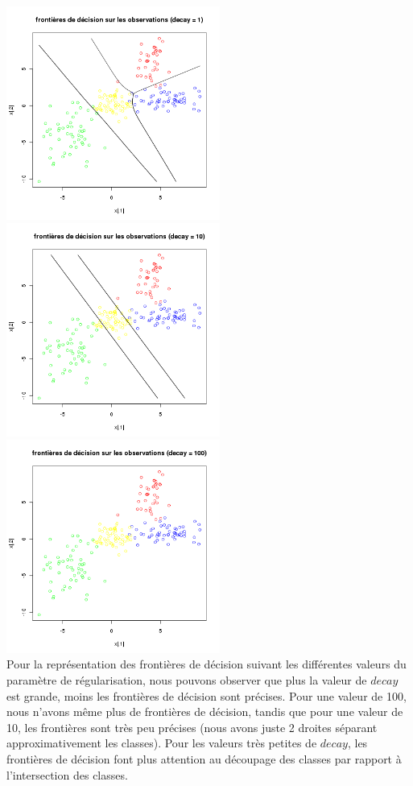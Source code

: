 \documentclass[a4paper, 10pt]{article}
\begin{document}
\includegraphics[height = 7cm, width = 7cm]{plots/frontiere_bayes_q4_4.png}\\
\includegraphics[height = 7cm, width = 7cm]{plots/frontiere_bayes_q4_5.png}
\includegraphics[height = 7cm, width = 7cm]{plots/frontiere_bayes_q4_6.png}\\
Pour la représentation des frontières de décision suivant les différentes valeurs du paramètre de régularisation, nous pouvons observer que plus la valeur de $decay$ est grande, moins les frontières de décision sont précises. Pour une valeur de 100, nous n'avons même plus de frontières de décision, tandis que pour une valeur de 10, les frontières sont très peu précises (nous avons juste 2 droites séparant approximativement les classes). Pour les valeurs très petites de $decay$, les frontières de décision font plus attention au découpage des classes par rapport à l'intersection des classes.\\ \\
\end{document}
